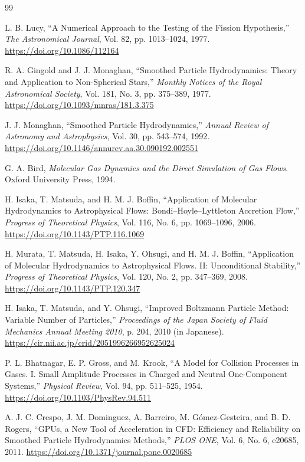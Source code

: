 \documentclass[a4paper,11pt]{article}
\begin{document}
\begin{thebibliography}{99}

L. B. Lucy, ``A Numerical Approach to the Testing of the Fission Hypothesis,''
\textit{The Astronomical Journal}, Vol. 82, pp. 1013--1024, 1977.
\url{https://doi.org/10.1086/112164}

R. A. Gingold and J. J. Monaghan,
``Smoothed Particle Hydrodynamics: Theory and Application to Non-Spherical
Stars,'' \textit{Monthly Notices of the Royal Astronomical Society}, Vol. 181,
No. 3, pp. 375--389, 1977.
\url{https://doi.org/10.1093/mnras/181.3.375}

J. J. Monaghan, ``Smoothed Particle Hydrodynamics,''
\textit{Annual Review of Astronomy and Astrophysics}, Vol. 30, pp. 543--574,
1992.
\url{https://doi.org/10.1146/annurev.aa.30.090192.002551}

G. A. Bird, \textit{Molecular Gas Dynamics and the Direct Simulation of Gas
Flows}. Oxford University Press, 1994.

H. Isaka, T. Matsuda, and H. M. J. Boffin,
``Application of Molecular Hydrodynamics to Astrophysical Flows:
Bondi--Hoyle--Lyttleton Accretion Flow,''
\textit{Progress of Theoretical Physics}, Vol. 116, No. 6, pp. 1069--1096,
2006.
\url{https://doi.org/10.1143/PTP.116.1069}

H. Murata, T. Matsuda, H. Isaka, Y. Ohsugi, and H. M. J. Boffin,
``Application of Molecular Hydrodynamics to Astrophysical Flows. II:
Unconditional Stability,'' \textit{Progress of Theoretical Physics}, Vol. 120,
No. 2, pp. 347--369, 2008.
\url{https://doi.org/10.1143/PTP.120.347}

H. Isaka, T. Matsuda, and Y. Ohsugi,
``Improved Boltzmann Particle Method: Variable Number of Particles,''
\textit{Proceedings of the Japan Society of Fluid Mechanics Annual Meeting
2010}, p. 204, 2010 (in Japanese).
\url{https://cir.nii.ac.jp/crid/2051996266952625024}

P. L. Bhatnagar, E. P. Gross, and M. Krook,
``A Model for Collision Processes in Gases. I. Small Amplitude Processes in
Charged and Neutral One-Component Systems,''
\textit{Physical Review}, Vol. 94, pp. 511--525, 1954.
\url{https://doi.org/10.1103/PhysRev.94.511}

A. J. C. Crespo, J. M. Dominguez, A. Barreiro, M. G\'omez-Gesteira, and
B. D. Rogers, ``GPUs, a New Tool of Acceleration in CFD: Efficiency and
Reliability on Smoothed Particle Hydrodynamics Methods,''
\textit{PLOS ONE}, Vol. 6, No. 6, e20685, 2011.
\url{https://doi.org/10.1371/journal.pone.0020685}


\end{thebibliography}
\end{document}
